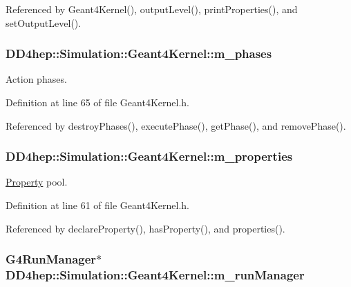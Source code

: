 Referenced by Geant4Kernel(), outputLevel(), printProperties(), and setOutputLevel().\hypertarget{class_d_d4hep_1_1_simulation_1_1_geant4_kernel_aa1357848649b7fccb42bbaa0c5f88f58}{
\subsubsection[{m\_\-phases}]{ {\bf DD4hep::Simulation::Geant4Kernel::m\_\-phases}}}
\label{class_d_d4hep_1_1_simulation_1_1_geant4_kernel_aa1357848649b7fccb42bbaa0c5f88f58}


Action phases. 

Definition at line 65 of file Geant4Kernel.h.

Referenced by destroyPhases(), executePhase(), getPhase(), and removePhase().\hypertarget{class_d_d4hep_1_1_simulation_1_1_geant4_kernel_ac69e53b910f7ce956e684c4e2ccedc9f}{
\subsubsection[{m\_\-properties}]{ {\bf DD4hep::Simulation::Geant4Kernel::m\_\-properties}}}
\label{class_d_d4hep_1_1_simulation_1_1_geant4_kernel_ac69e53b910f7ce956e684c4e2ccedc9f}


\hyperlink{class_d_d4hep_1_1_property}{Property} pool. 

Definition at line 61 of file Geant4Kernel.h.

Referenced by declareProperty(), hasProperty(), and properties().\hypertarget{class_d_d4hep_1_1_simulation_1_1_geant4_kernel_a3680634351832865b7df33095adf8ef7}{
\subsubsection[{m\_\-runManager}]{\setlength{\rightskip}{0pt plus 5cm}G4RunManager$\ast$ {\bf DD4hep::Simulation::Geant4Kernel::m\_\-runManager}}}
\label{class_d_d4hep_1_1_simulation_1_1_geant4_kernel_a3680634351832865b7df33095adf8ef7}


